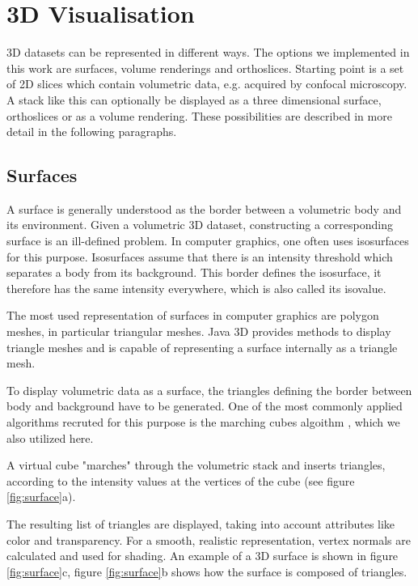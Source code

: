 \documentclass[a4paper,10pt]{article}
\begin{document}
\section{3D Visualisation}
3D datasets can be represented in different ways. The options we implemented in this work are surfaces, volume renderings and orthoslices.
Starting point is a set of 2D slices which contain volumetric data, e.g. acquired by confocal microscopy. A stack like this can optionally be displayed as a three dimensional surface, orthoslices or as a volume rendering. These possibilities are described in more detail in the following paragraphs.
\subsection{Surfaces}
A surface is generally understood as the border between a volumetric body and its environment. Given a volumetric 3D dataset, constructing a corresponding surface is an ill-defined problem. In computer graphics, one often uses isosurfaces for this purpose. Isosurfaces assume that there is an intensity threshold which separates a body from its background. This border defines the isosurface, it therefore has the same intensity everywhere, which is also called its isovalue.

The most used representation of surfaces in computer graphics are polygon meshes, in particular triangular meshes. Java 3D provides methods to display triangle meshes and is capable of representing a surface internally as a triangle mesh.

To display volumetric data as a surface, the triangles defining the border between body and background have to be generated. One of the most commonly applied algorithms recruted for this purpose is the marching cubes algoithm \cite{lorensen87}, which we also utilized here.

A virtual cube "marches" through the volumetric stack and inserts triangles, according to the intensity values at the vertices of the cube (see figure \ref{fig:surface}a).

The resulting list of triangles are displayed, taking into account attributes like color and transparency. For a smooth, realistic representation, vertex normals are calculated and used for shading. An example of a 3D surface is shown in figure \ref{fig:surface}c, figure \ref{fig:surface}b shows how the surface is composed of triangles.
\end{document}
